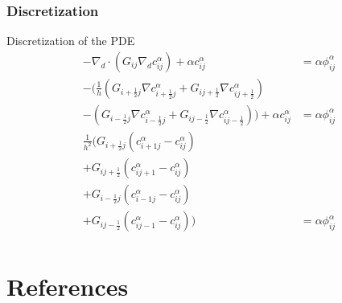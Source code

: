 \documentclass[11pt]{article}
\begin{document}
\subsubsection{Discretization}
\label{sec:org12de1ac}
Discretization of the PDE
\begin{align*}
- \nabla_d \cdot  (G_{ij} \nabla_d c_{ij}^\alpha) + \alpha  c_{ij}^\alpha &= \alpha \phi_{ij}^\alpha \\
- (\frac{1}{h}(G_{i+\frac{1}{2}j} \nabla c^\alpha_{i+\frac{1}{2}j} + G_{ij+\frac{1}{2}} \nabla c^\alpha_{ij+\frac{1}{2}}) &  \\
- (G_{i-\frac{1}{2}j} \nabla c^\alpha_{i-\frac{1}{2}j} + G_{ij-\frac{1}{2}} \nabla c^\alpha_{ij-\frac{1}{2}})) + \alpha  c_{ij}^\alpha   &= \alpha  \phi_{ij}^\alpha \\
\frac{1}{h^2} ( G_{i+\frac{1}{2}j}(c_{i+1j}^\alpha - c_{ij}^\alpha) & \\
+G_{ij+\frac{1}{2}}(c_{ij+1}^\alpha - c_{ij}^\alpha) &\\
+G_{i-\frac{1}{2}j}(c_{i-1j}^\alpha - c_{ij}^\alpha)&\\
+G_{ij-\frac{1}{2}}(c_{ij-1}^\alpha - c_{ij}^\alpha))&=\alpha  \phi_{ij}^\alpha \\
\end{align*}
\section{References}
\label{sec:orgfef094c}
\printbibliography
\end{document}
